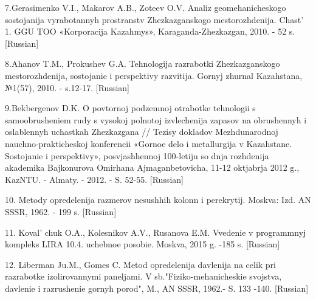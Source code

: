 \begin{references}
7.Gerasimenko V.I., Makarov A.B., Zoteev O.V. Analiz geomehanicheskogo
sostojanija vyrabotannyh prostranstv Zhezkazganskogo mestorozhdenija.
Chast'{} 1. GGU TOO «Korporacija Kazahmys»,
Karaganda-Zhezkazgan, 2010. - 52 s. {[}Russian{]}

8.Ahanov T.M., Prokushev G.A. Tehnologija razrabotki Zhezkazganskogo
mestorozhdenija, sostojanie i perspektivy razvitija. Gornyj zhurnal
Kazahstana, №1(57), 2010. - s.12-17. {[}Russian{]}

9.Bekbergenov D.K. O povtornoj podzemnoj otrabotke tehnologii s
samoobrusheniem rudy s vysokoj polnotoj izvlechenija zapasov na
obrushennyh i oslablennyh uchastkah Zhezkazgana // Tezisy dokladov
Mezhdunarodnoj nauchno-prakticheskoj konferencii «Gornoe delo i
metallurgija v Kazahstane. Sostojanie i perspektivy», posvjashhennoj
100-letiju so dnja rozhdenija akademika Bajkonurova Omirhana
Ajmaganbetovicha, 11-12 oktjabrja 2012 g., KazNTU. - Almaty. - 2012. -
S. 52-55. {[}Russian{]}

10. Metody opredelenija razmerov nesushhih kolonn i perekrytij. Moskva:
Izd. AN SSSR, 1962. - 199 s. {[}Russian{]}

11. Koval' chuk O.A., Kolesnikov A.V., Rusanova E.M.
Vvedenie v programmnyj kompleks LIRA 10.4. uchebnoe posobie. Moskva,
2015 g. -185 s. {[}Russian{]}

12. Liberman Ju.M., Gomes C. Metod opredelenija davlenija na celik pri
razrabotke izolirovannymi paneljami. V sb."Fiziko-mehanicheskie
svojstva, davlenie i razrushenie gornyh porod", M., AN SSSR, 1962.- S.
133 -140. {[}Russian{]}
\end{references}

